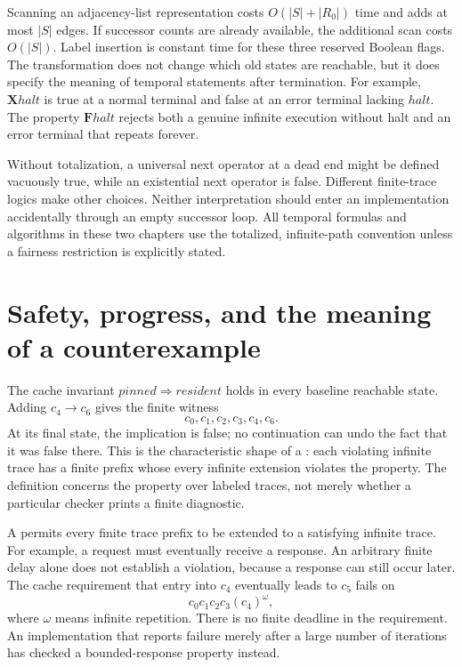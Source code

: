 Scanning an adjacency-list representation costs $O(|S|+|R_0|)$ time and adds at most $|S|$ edges.
If successor counts are already available, the additional scan costs $O(|S|)$.
Label insertion is constant time for these three reserved Boolean flags.
The transformation does not change which old states are reachable, but it does specify the meaning of temporal statements after termination.
For example, $\mathbf{X}\mathit{halt}$ is true at a normal terminal and false at an error terminal lacking $\mathit{halt}$.
The property $\mathbf{F}\mathit{halt}$ rejects both a genuine infinite execution without halt and an error terminal that repeats forever.

Without totalization, a universal next operator at a dead end might be defined vacuously true, while an existential next operator is false.
Different finite-trace logics make other choices.
Neither interpretation should enter an implementation accidentally through an empty successor loop.
All temporal formulas and algorithms in these two chapters use the totalized, infinite-path convention unless a fairness restriction is explicitly stated.

\section{Safety, progress, and the meaning of a counterexample}
\label{sec:ch45-safety-liveness}

The cache invariant $\mathit{pinned}\Rightarrow\mathit{resident}$ holds in every baseline reachable state.
Adding $c_4\to c_6$ gives the finite witness
\[
 c_0,c_1,c_2,c_3,c_4,c_6.
\]
At its final state, the implication is false; no continuation can undo the fact that it was false there.
This is the characteristic shape of a : each violating infinite trace has a finite prefix whose every infinite extension violates the property.
The definition concerns the property over labeled traces, not merely whether a particular checker prints a finite diagnostic.

A  permits every finite trace prefix to be extended to a satisfying infinite trace.
For example, a request must eventually receive a response.
An arbitrary finite delay alone does not establish a violation, because a response can still occur later.
The cache requirement that entry into $c_4$ eventually leads to $c_5$ fails on
\[
 c_0c_1c_2c_3(c_4)^\omega,
\]
where $\omega$ means infinite repetition.
There is no finite deadline in the requirement.
An implementation that reports failure merely after a large number of iterations has checked a bounded-response property instead.

